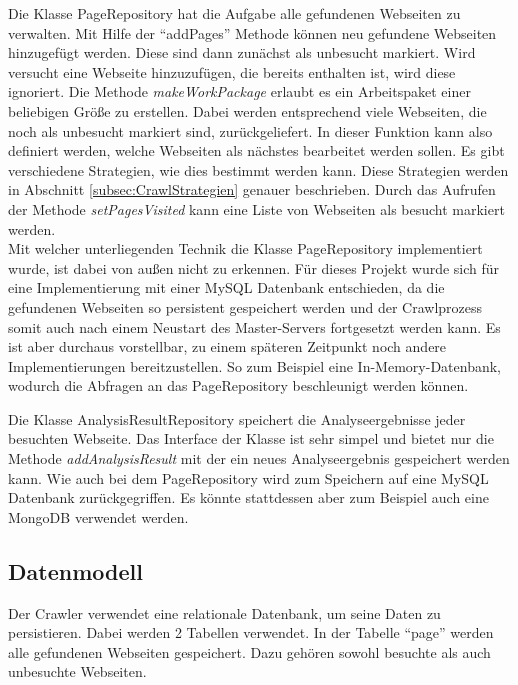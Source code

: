 Die Klasse PageRepository hat die Aufgabe alle gefundenen Webseiten zu verwalten. Mit Hilfe der \enquote{addPages} Methode können neu gefundene Webseiten hinzugefügt werden. Diese sind dann zunächst als unbesucht markiert. Wird versucht eine Webseite hinzuzufügen, die bereits enthalten ist, wird diese ignoriert. Die Methode \textit{makeWorkPackage} erlaubt es ein Arbeitspaket einer beliebigen Größe zu erstellen. Dabei werden entsprechend viele Webseiten, die noch als unbesucht markiert sind, zurückgeliefert. In dieser Funktion kann also definiert werden, welche Webseiten als nächstes bearbeitet werden sollen. Es gibt verschiedene Strategien, wie dies bestimmt werden kann. Diese Strategien werden in Abschnitt \ref{subsec:CrawlStrategien} genauer beschrieben. Durch das Aufrufen der Methode \textit{setPagesVisited} kann eine Liste von Webseiten als besucht markiert werden. \\
Mit welcher unterliegenden Technik die Klasse PageRepository implementiert wurde, ist dabei von außen nicht zu erkennen. Für dieses Projekt wurde sich für eine Implementierung mit einer MySQL Datenbank entschieden, da die gefundenen Webseiten so persistent gespeichert werden und der Crawlprozess somit auch nach einem Neustart des Master-Servers fortgesetzt werden kann. Es ist aber durchaus vorstellbar, zu einem späteren Zeitpunkt noch andere Implementierungen bereitzustellen. So zum Beispiel eine In-Memory-Datenbank, wodurch die Abfragen an das PageRepository beschleunigt werden können.

Die Klasse AnalysisResultRepository speichert die Analyseergebnisse jeder besuchten Webseite. Das Interface der Klasse ist sehr simpel und bietet nur die Methode \textit{addAnalysisResult} mit der ein neues Analyseergebnis gespeichert werden kann. Wie auch bei dem PageRepository wird zum Speichern auf eine MySQL Datenbank zurückgegriffen. Es könnte stattdessen aber zum Beispiel auch eine MongoDB verwendet werden.

\subsection{Datenmodell}
Der Crawler verwendet eine relationale Datenbank, um seine Daten zu persistieren. Dabei werden 2 Tabellen verwendet. In der Tabelle \enquote{page} werden alle gefundenen Webseiten gespeichert. Dazu gehören sowohl besuchte als auch unbesuchte Webseiten.

